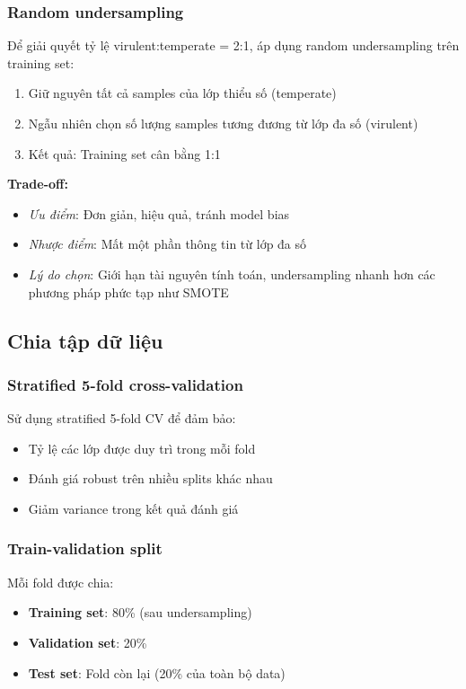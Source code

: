\subsubsection{Random undersampling}

Để giải quyết tỷ lệ virulent:temperate = 2:1, áp dụng random undersampling trên training set:

\begin{enumerate}
    \item Giữ nguyên tất cả samples của lớp thiểu số (temperate)
    \item Ngẫu nhiên chọn số lượng samples tương đương từ lớp đa số (virulent)
    \item Kết quả: Training set cân bằng 1:1
\end{enumerate}

\textbf{Trade-off:}
\begin{itemize}
    \item \textit{Ưu điểm}: Đơn giản, hiệu quả, tránh model bias
    \item \textit{Nhược điểm}: Mất một phần thông tin từ lớp đa số
    \item \textit{Lý do chọn}: Giới hạn tài nguyên tính toán, undersampling nhanh hơn các phương pháp phức tạp như SMOTE
\end{itemize}

\subsection{Chia tập dữ liệu}

\subsubsection{Stratified 5-fold cross-validation}

Sử dụng stratified 5-fold CV để đảm bảo:
\begin{itemize}
    \item Tỷ lệ các lớp được duy trì trong mỗi fold
    \item Đánh giá robust trên nhiều splits khác nhau
    \item Giảm variance trong kết quả đánh giá
\end{itemize}

\subsubsection{Train-validation split}

Mỗi fold được chia:
\begin{itemize}
    \item \textbf{Training set}: 80\% (sau undersampling)
    \item \textbf{Validation set}: 20\%
    \item \textbf{Test set}: Fold còn lại (20\% của toàn bộ data)
\end{itemize}


